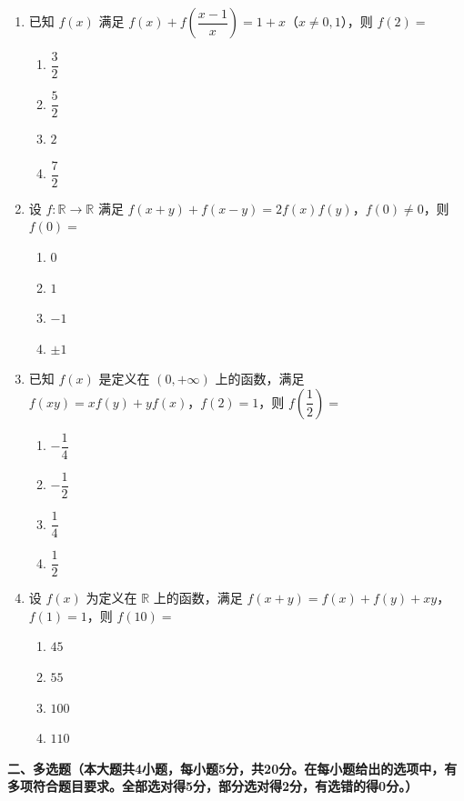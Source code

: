 \documentclass[12pt, a4paper]{ctexart}
\newcommand{\score}[1]{\hfill\makebox[2cm][l]{(#1分)}}
\begin{document}
\begin{enumerate}
\item 已知 $f(x)$ 满足 $f(x) + f\left(\dfrac{x-1}{x}\right) = 1 + x$（$x \neq 0, 1$），则 $f(2) = $\score{5}
\begin{enumerate}[label=\Alph*.]
\item $\dfrac{3}{2}$
\item $\dfrac{5}{2}$
\item $2$
\item $\dfrac{7}{2}$
\end{enumerate}

\item 设 $f: \mathbb{R} \to \mathbb{R}$ 满足 $f(x+y) + f(x-y) = 2f(x)f(y)$，$f(0) \neq 0$，则 $f(0) = $\score{5}
\begin{enumerate}[label=\Alph*.]
\item $0$
\item $1$
\item $-1$
\item $\pm 1$
\end{enumerate}

\item 已知 $f(x)$ 是定义在 $(0, +\infty)$ 上的函数，满足 $f(xy) = xf(y) + yf(x)$，$f(2) = 1$，则 $f\left(\dfrac{1}{2}\right) = $\score{5}
\begin{enumerate}[label=\Alph*.]
\item $-\dfrac{1}{4}$
\item $-\dfrac{1}{2}$
\item $\dfrac{1}{4}$
\item $\dfrac{1}{2}$
\end{enumerate}

\item 设 $f(x)$ 为定义在 $\mathbb{R}$ 上的函数，满足 $f(x+y) = f(x) + f(y) + xy$，$f(1) = 1$，则 $f(10) = $\score{5}
\begin{enumerate}[label=\Alph*.]
\item $45$
\item $55$
\item $100$
\item $110$
\end{enumerate}

\end{enumerate}

\vspace{0.5cm}

\noindent\textbf{二、多选题（本大题共4小题，每小题5分，共20分。在每小题给出的选项中，有多项符合题目要求。全部选对得5分，部分选对得2分，有选错的得0分。）}

\vspace{0.3cm}
\end{document}
